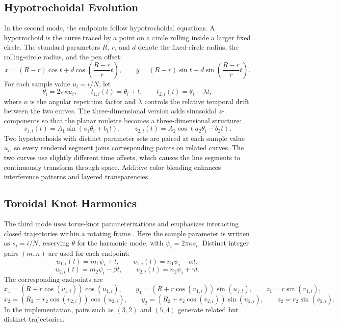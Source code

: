 \documentclass[letterpaper,11pt]{article}
\begin{document}
\subsection*{Hypotrochoidal Evolution}

In the second mode, the endpoints follow hypotrochoidal equations. A hypotrochoid is the curve traced by a point on a circle rolling inside a larger fixed circle. The standard parameters $R$, $r$, and $d$ denote the fixed-circle radius, the rolling-circle radius, and the pen offset:
\[
x = (R-r)\cos t + d\cos\left(\frac{R-r}{r}t\right), \qquad
y = (R-r)\sin t - d\sin\left(\frac{R-r}{r}t\right).
\]
For each sample value $u_i=i/N$, let
\[
\theta_i = 2\pi \kappa u_i, \qquad
t_{1,i}(t)=\theta_i+t, \qquad
t_{2,i}(t)=\theta_i-\lambda t,
\]
where $\kappa$ is the angular repetition factor and $\lambda$ controls the relative temporal drift between the two curves. The three-dimensional version adds sinusoidal $z$-components so that the planar roulette becomes a three-dimensional structure:
\[
z_{1,i}(t)=A_1\sin(a_1\theta_i+b_1 t), \qquad
z_{2,i}(t)=A_2\cos(a_2\theta_i-b_2 t).
\]
Two hypotrochoids with distinct parameter sets are paired at each sample value $u_i$, so every rendered segment joins corresponding points on related curves. The two curves use slightly different time offsets, which causes the line segments to continuously transform through space. Additive color blending enhances interference patterns and layered transparencies.


\subsection*{Toroidal Knot Harmonics}

The third mode uses torus-knot parameterizations and emphasizes interacting closed trajectories within a rotating frame \cite{sequin2012topological}. Here the sample parameter is written as $s_i=i/N$, reserving $\theta$ for the harmonic mode, with $\psi_i = 2\pi \kappa s_i$. Distinct integer pairs $(m,n)$ are used for each endpoint:
\[
u_{1,i}(t)=m_1\psi_i+t, \qquad
v_{1,i}(t)=n_1\psi_i-\alpha t,
\]
\[
u_{2,i}(t)=m_2\psi_i-\beta t, \qquad
v_{2,i}(t)=n_2\psi_i+\gamma t.
\]
The corresponding endpoints are
\[
x_1 = (R + r\cos(v_{1,i}))\cos(u_{1,i}), \qquad
y_1 = (R + r\cos(v_{1,i}))\sin(u_{1,i}), \qquad
z_1 = r\sin(v_{1,i}),
\]
\[
x_2 = (R_2 + r_2\cos(v_{2,i}))\cos(u_{2,i}), \qquad
y_2 = (R_2 + r_2\cos(v_{2,i}))\sin(u_{2,i}), \qquad
z_2 = r_2\sin(v_{2,i}).
\]
In the implementation, pairs such as $(3,2)$ and $(5,4)$ generate related but distinct trajectories.
\end{document}
